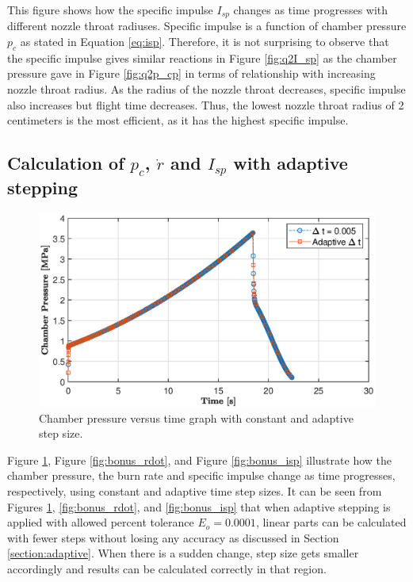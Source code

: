 \documentclass[letterpaper,12pt]{article}
\begin{document}
This figure shows how the specific impulse $I_{sp}$ changes as time progresses with different nozzle throat radiuses.
Specific impulse is a function of chamber pressure $p_c$ as stated in Equation \ref{eq:isp}. 
Therefore, it is not surprising to observe that the specific impulse gives similar reactions in Figure \ref{fig:q2I_sp} 
as the chamber pressure gave in Figure \ref{fig:q2p_cp} in terms of relationship with increasing nozzle throat radius. 
As the radius of the nozzle throat decreases, specific impulse also increases but flight time decreases. Thus, the 
lowest nozzle throat radius of 2 centimeters is the most efficient, as it has the highest specific impulse.

\newpage
\subsection{Calculation of $p_c$, $\dot{r}$ and $I_{sp}$ with adaptive stepping}

\begin{figure}[!h]
	\centering
	\includegraphics[height = 8.5 cm]{graphs/bonus_pc.eps}
	\caption{Chamber pressure versus time graph with constant and adaptive step size.}
	\label{fig:bonus_cp}
\end{figure}

Figure \ref{fig:bonus_cp}, Figure \ref{fig:bonus_rdot}, and Figure \ref{fig:bonus_isp} illustrate how the chamber pressure, 
the burn rate and specific impulse change as time progresses, respectively, using constant and adaptive time step sizes.
It can be seen from Figures \ref{fig:bonus_cp}, \ref{fig:bonus_rdot}, and \ref{fig:bonus_isp} that when adaptive stepping is 
applied with allowed percent tolerance $E_o = 0.0001$, linear parts can be calculated with fewer steps without losing any accuracy as discussed in 
Section \ref{section:adaptive}. When there is a sudden change, step size gets smaller accordingly and results can be calculated correctly in that region.
\end{document}
